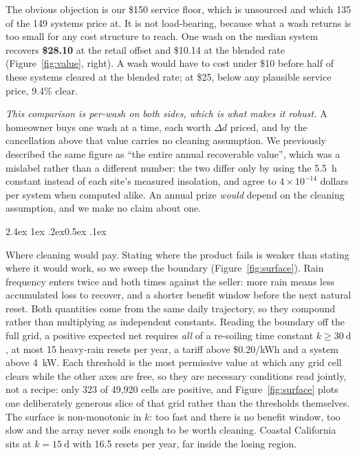 \documentclass[10pt,twocolumn]{article}
\makeatletter
\renewcommand\paragraph{\@startsection{paragraph}{4}{\z@}%
  {2.4ex \@plus1ex \@minus.2ex}{0.5ex \@plus .1ex}%
  {\normalfont\normalsize\bfseries\raggedright}}
\makeatother
\begin{document}
The obvious objection is our \$150 service floor, which is unsourced and which 135 of the
149 systems price at. It is not load-bearing, because what a wash returns is
too small for any cost structure to reach. One wash on the median system recovers
\textbf{\$28.10} at the retail offset and \$10.14 at the blended rate
(Figure~\ref{fig:value}, right). A wash would have to cost under \$10 before half of these
systems cleared at the blended rate; at \$25, below any plausible service price, 9.4\%
clear.

\emph{This comparison is per-wash on both sides, which is what makes it robust.} A
homeowner buys one wash at a time, each worth $\Delta d$ priced, and by the cancellation
above that value carries no cleaning assumption. We previously described the same figure as
``the entire annual recoverable value'', which was a mislabel rather than a different
number: the two differ only by using the \SI{5.5}{\hour} constant instead of each site's
measured insolation, and agree to $4\times10^{-14}$ dollars per system when computed
alike. An annual prize \emph{would} depend on the cleaning assumption, and we make no claim
about one.

\paragraph{Where cleaning would pay.}
Stating where the product fails is weaker than stating where it would work, so we sweep
the boundary (Figure~\ref{fig:surface}). Rain frequency enters twice and both times
against the seller: more rain means less accumulated loss to recover, and a shorter
benefit window before the next natural reset. Both quantities come from the same daily
trajectory, so they compound rather than multiplying as independent constants. Reading the boundary off the full grid, a positive expected net requires \emph{all} of a
re-soiling time constant $k \geq \SI{30}{\day}$, at most 15 heavy-rain resets per year, a
tariff above \$0.20/kWh and a system above \SI{4}{\kilo\watt}. Each threshold is the most
permissive value at which any grid cell clears while the other axes are free, so they are
necessary conditions read jointly, not a recipe: only 323 of 49{,}920 cells are positive,
and Figure~\ref{fig:surface} plots one deliberately generous slice of that grid rather
than the thresholds themselves. The surface is
non-monotonic in $k$: too fast and there is no benefit window, too slow and the array
never soils enough to be worth cleaning. Coastal California sits at $k=\SI{15}{\day}$ with
16.5 resets per year, far inside the losing region.
\end{document}
